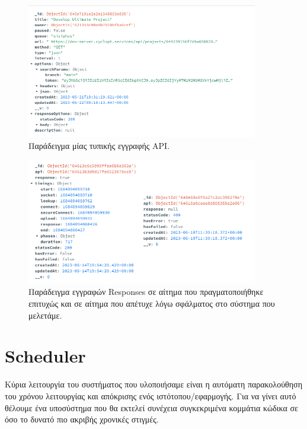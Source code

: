 \begin{figure}[!ht]
	\centering
	\includegraphics[width=0.9\textwidth]{./images/chapter4/api_doc.png}
	\caption[Παράδειγμα μίας τυπικής εγγραφής API.]{Παράδειγμα μίας τυπικής εγγραφής API.}
	\label{fig:api_doc}
\end{figure}\textbf{}

\begin{figure}[!ht]
	\centering
	\includegraphics[width=0.9\textwidth]{./images/chapter4/response_docs.png}
	\caption[Παράδειγμα εγγραφών Responses σε αίτημα που πραγματοποιήθηκε επιτυχώς και σε αίτημα που απέτυχε λόγω σφάλματος στο σύστημα που μελετάμε.]{Παράδειγμα εγγραφών Responses σε αίτημα που πραγματοποιήθηκε επιτυχώς και σε αίτημα που απέτυχε λόγω σφάλματος στο σύστημα που μελετάμε.}
	\label{fig:response_docs}
\end{figure}\textbf{}

\section{Scheduler}
\label{section:lychte_scheduler}

Κύρια λειτουργία του συστήματος που υλοποιήσαμε είναι η αυτόματη παρακολούθηση του χρόνου λειτουργίας και απόκρισης ενός ιστότοπου/εφαρμογής. Για να γίνει αυτό θέλουμε ένα υποσύστημα που θα εκτελεί συνέχεια συγκεκριμένα κομμάτια κώδικα σε όσο το δυνατό πιο ακριβής χρονικές στιγμές.

